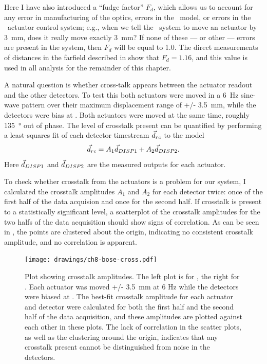 Here I have also introduced a ``fudge factor'' $F_d$, which allows us to account for any error in manufacturing of the optics, errors in the \ZEMAX\ model, or errors in the \BOSE\ actuator control system; e.g., when we tell the \BOSE\ system to move an actuator by \SI{3}{\mm}, does it really move exactly \SI{3}{\mm}?
If none of these --- or other --- errors are present in the system, then $F_d$ will be equal to 1.0.
The direct measurements of distances in the farfield described in  show that $F_d = 1.16$, and this value is used in all analysis for the remainder of this chapter.


A natural question is whether cross-talk appears between the actuator readout and the other detectors.
To test this both actuators were moved in a \SI{6}{\Hz} sine-wave pattern over their maximum displacement range of +/- 3.5~mm, while the detectors were bias at \SOC.
Both actuators were moved at the same time, roughly \SI{135}{\degree} out of phase.
The level of crosstalk present can be quantified by performing a least-squares fit of each detector timestream $\vec{d}_{rc}$ to the model
\begin{equation}
	 \vec{d}_{rc} = A_1 \vec{d}_{{\small DISP{1}}} + A_2 \vec{d}_{{\small DISP{2}}}.
\end{equation}
Here $\vec{d}_{{\small DISP{1}}}$ and $\vec{d}_{{\small DISP{2}}}$ are the measured outputs for each actuator.

To check whether crosstalk from the actuators is a problem for our system, I calculated the crosstalk amplitudes $A_1$ and $A_2$ for each detector twice: once of the first half of the data acquision and once for the second half.
If crosstalk is present to a statistically significant level, a scatterplot of the crosstalk amplitudes for the two halfs of the data acquisition should show signs of correlation.
As can be seen in , the points are clustered about the origin, indicating no consistent crosstalk amplitude, and no correlation is apparent.

\begin{figure}[th]
\centering
\texttt{[image: drawings/ch8-bose-cross.pdf]}
\caption{
Plot showing crosstalk amplitudes.
The left plot is for , the right for .
Each actuator was moved +/- \SI{3.5}{\mm} at 6 Hz while the detectors were biased at \SOC.
The best-fit crosstalk amplitude for each actuator and detector were calculated for both the first half and the second half of the data acquisition, and these amplitudes are plotted against each other in these plots.
The lack of correlation in the scatter plots, as well as the clustering around the origin, indicates that any crosstalk present cannot be distinguished from noise in the detectors.
}
\label{fig:ch8-bose-cross}
\end{figure}

